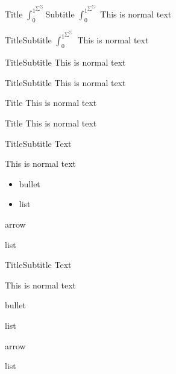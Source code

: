 \documentclass[english,notes]{beamer}
\begin{document}
\begin{frame}{Title $\int_0^{1^{\sum^\sum}}$}{Subtitle $\int_0^{1^{\sum^\sum}}$}
    This is normal text
\end{frame}

\begin{frame}{Title}{Subtitle $\int_0^{1^{\sum^\sum}}$}
    This is normal text
\end{frame}

\begin{frame}{Title}{Subtitle}
    This is normal text
\end{frame}

\begin{frame}{Title}{Subtitle}
    This is normal text
\end{frame}

\begin{frame}{Title}
    This is normal text
\end{frame}

\begin{frame}{Title}
    This is normal text
\end{frame}

\begin{frame}{Title}{Subtitle}
Text

This is normal text

\begin{itemize}
    \item bullet
    \item list
\end{itemize}

\begin{arrowlist}
    \item arrow
    \item list
\end{arrowlist}

\end{frame}

\makeatletter
\ikr@gridtrue
\makeatother

\begin{frame}{Title}{Subtitle}
Text

This is normal text

bullet

list

arrow

list

\end{frame}
\end{document}
